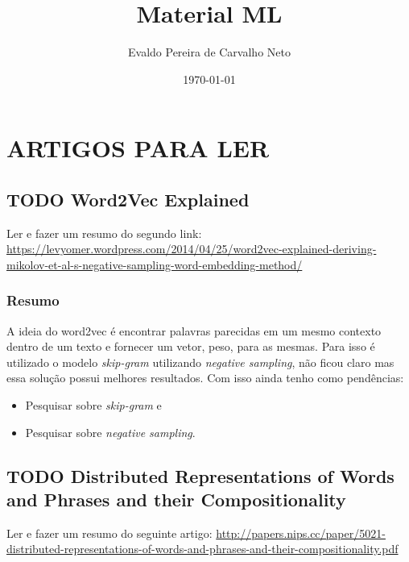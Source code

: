 \documentclass[11pt]{article}
\author{Evaldo Pereira de Carvalho Neto}
\date{\today}
\title{Material ML}
\begin{document}
\maketitle
\tableofcontents


\section{ARTIGOS PARA LER}
\label{sec-1}

\subsection{{\bfseries\sffamily TODO} Word2Vec Explained}
\label{sec-1-1}
Ler e fazer um resumo do segundo link:
\url{https://levyomer.wordpress.com/2014/04/25/word2vec-explained-deriving-mikolov-et-al-s-negative-sampling-word-embedding-method/}

\subsubsection{Resumo}
\label{sec-1-1-1}

    A ideia do word2vec é encontrar palavras parecidas em um mesmo contexto dentro de um texto e fornecer um vetor, peso, para
as mesmas. Para isso é utilizado o modelo \textit{skip-gram} utilizando \textit{negative sampling},  não ficou claro mas essa solução possui
melhores resultados. Com isso ainda tenho como pendências:
\begin{itemize}
\item Pesquisar sobre \textit{skip-gram} e
\item Pesquisar sobre \textit{negative sampling}.
\end{itemize}

\subsection{{\bfseries\sffamily TODO} Distributed Representations of Words and Phrases and their Compositionality}
\label{sec-1-2}
Ler e fazer um resumo do seguinte artigo:
\url{http://papers.nips.cc/paper/5021-distributed-representations-of-words-and-phrases-and-their-compositionality.pdf}
\end{document}
